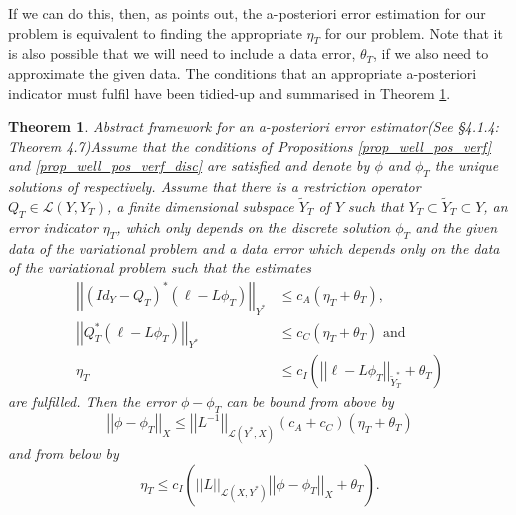 \documentclass[12pt,a4paper]{article}
\newtheorem{theorem}{Theorem}[section]
\theoremstyle{definition}
\begin{document}
If we can do this, then, as \cite{verfurth2013posteriori} points out, the a-posteriori error estimation for our problem is equivalent to finding the appropriate $\eta_T$ for our problem.  Note that it is also possible that we will need to include a data error, $\theta_T$, if we also need to approximate the given data.  The conditions that an appropriate a-posteriori indicator must fulfil have been tidied-up and summarised in Theorem \ref{verf_thm_apost_bounds}.
\begin{theorem}{Abstract framework for an a-posteriori error estimator}(See \cite{verfurth2013posteriori} \S4.1.4: Theorem 4.7)\label{verf_thm_apost_bounds}
	Assume that the conditions of Propositions \ref{prop_well_pos_verf} and \ref{prop_well_pos_verf_disc} are satisfied and denote by $\phi$ and $\phi_T$ the unique solutions of respectively. Assume that there is a restriction operator $Q_T\in \mathcal{L}\left(Y,Y_T\right)$, a finite dimensional subspace $\widetilde{Y}_T$ of $Y$ such that $Y_T\subset\widetilde{Y}_T\subset Y$, an error indicator $\eta_T$, which only depends on the discrete solution $\phi_T$ and the given data of the variational problem and a data error which depends only on the data of the variational problem such that the estimates
	\begin{equation}\nonumber
	\begin{aligned}
	\left|\left|\left(Id_Y-Q_T\right)^*\left(\ell -L\phi_T\right)\right|\right|_{Y^*}&\leq c_A \left(\eta_T + \theta_T\right),\\
	\left|\left|Q_T^*\left(\ell -L\phi_T\right)\right|\right|_{Y^*}&\leq c_C\left(\eta_T+\theta_T\right)\text{ and}\\
	\eta_T &\leq c_I\left(\left|\left|\ell - L\phi_T\right|\right|_{\widetilde{Y}^*_T}+ \theta_T\right)
	\end{aligned}
	\end{equation}
	are fulfilled.  Then the error $\phi-\phi_T$ can be bound from above by
	\begin{equation}\nonumber
	\left|\left|\phi-\phi_T\right|\right|_X\leq\left|\left|L^{-1}\right|\right|_{\mathcal{L}\left(Y^*,X\right)}\left(c_A+c_C\right)\left(\eta_T+\theta_T\right)
	\end{equation}
	and from below by 
	\begin{equation}\nonumber
	\eta_T\leq c_I\left(\left|\left|L\right|\right|_{\mathcal{L}\left(X,Y^*\right)}\left|\left|\phi-\phi_T\right|\right|_X+\theta_T\right).
	\end{equation}
\end{theorem}
\end{document}
